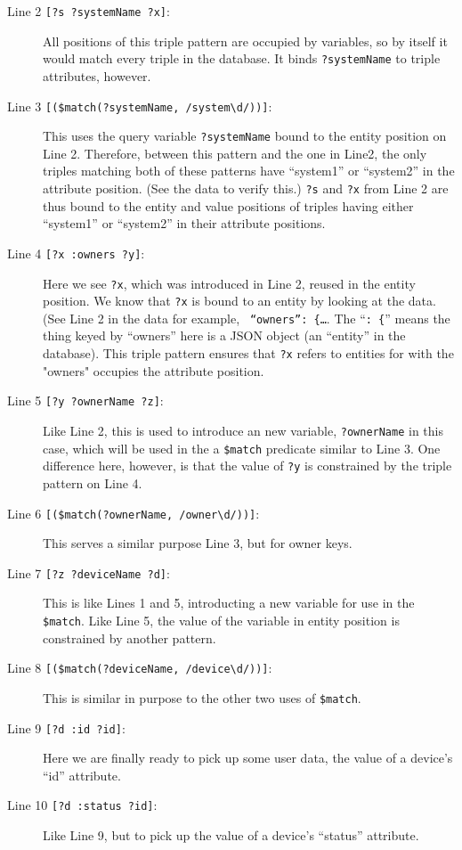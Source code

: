 \documentclass[9pt,letterpaper]{article}
\newcommand{\stt}[1]{\texttt{#1}}
\begin{document}
\begin{description}
\item[Line 2 \stt{[?s ?systemName ?x]}:] All positions of this triple pattern are occupied by variables, so by itself it would match every triple in the database. It binds \stt{?systemName} to triple attributes, however.
\item[Line 3 \stt{[(\$match(?systemName, /system\textbackslash d/))]}:] This uses the query variable \stt{?systemName} bound to the entity position on Line 2.
  Therefore, between this pattern and the one in Line2, the only triples matching both of these patterns have ``system1'' or ``system2'' in the attribute position. (See the data to verify this.)
  \stt{?s} and \stt{?x} from Line 2 are thus bound to the entity and value positions of triples having either ``system1'' or ``system2'' in their attribute positions.
\item[Line 4 \stt{[?x :owners ?y]}:] Here we see \stt{?x}, which was introduced in Line 2, reused in the entity position.
  We know that \stt{?x} is bound to an entity by looking at the data.
  (See Line 2 in the data for example, \stt{ ``owners'': \{\ldots}. The ``\stt{: \{}'' means the thing keyed by ``owners'' here is a JSON object (an ``entity'' in the database).
  This triple pattern ensures that \stt{?x} refers to entities for with the "owners" occupies the attribute position.
\item[Line 5 \stt{[?y ?ownerName ?z]}:]  Like Line 2, this is used to introduce an new variable, \stt{?ownerName} in this case, which will be used in the a \stt{\$match} predicate similar to Line 3.
  One difference here, however, is that the value of \stt{?y} is constrained by the triple pattern on Line 4.
\item[Line 6 \stt{[(\$match(?ownerName, /owner\textbackslash d/))]}:] This serves a similar purpose Line 3, but for owner keys.
\item[Line 7 \stt{[?z ?deviceName ?d]}:] This is like Lines 1 and 5, introducting a new variable for use in the \stt{\$match}.
  Like Line 5, the value of the variable in entity position is constrained by another pattern.
\item[Line 8 \stt{[(\$match(?deviceName, /device\textbackslash d/))]}:] This is similar in purpose to the other two uses of \stt{\$match}.
\item[Line 9 \stt{[?d :id ?id]}:] Here we are finally ready to pick up some user data, the value of a device's ``id'' attribute.
\item[Line 10 \stt{[?d :status ?id]}:] Like Line 9, but to pick up the value of a device's ``status'' attribute.
\end{description}  
\end{document}
